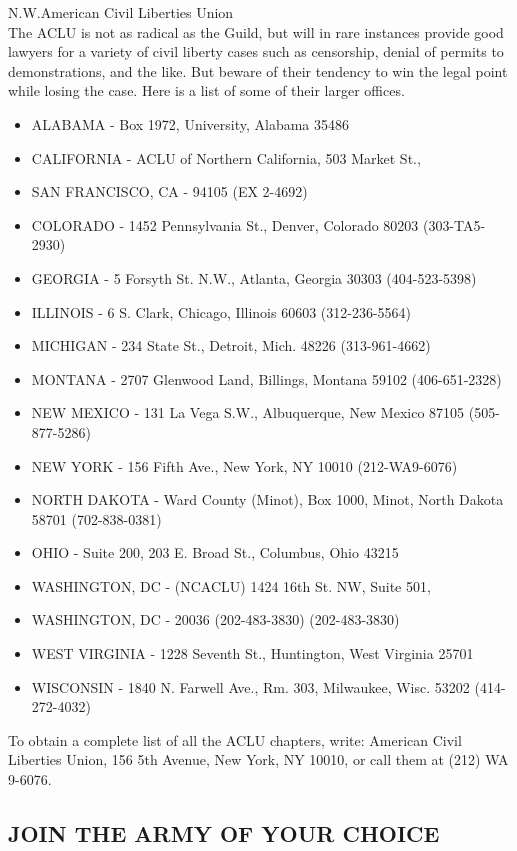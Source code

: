 \documentclass[11pt,twoside,a4paper]{book}
\begin{document}
N.W.American Civil Liberties Union~\\
The ACLU is not as radical as the Guild, but will in rare instances provide good lawyers for a variety of civil liberty cases such as censorship, denial of permits to demonstrations, and the like. But beware of their tendency to win the legal point while losing the case. Here is a list of some of their larger offices.~\\
\begin{itemize}
	\item ALABAMA - Box 1972, University, Alabama 35486 
	\item CALIFORNIA - ACLU of Northern California, 503 Market St., 
	\item SAN FRANCISCO, CA - 94105 (EX 2-4692) 
	\item COLORADO - 1452 Pennsylvania St.,  Denver, Colorado 80203 (303-TA5-2930) 
	\item GEORGIA - 5 Forsyth St. N.W., Atlanta, Georgia 30303 (404-523-5398) 
	\item ILLINOIS - 6 S. Clark, Chicago, Illinois 60603 (312-236-5564) 
	\item MICHIGAN - 234 State St., Detroit, Mich. 48226 (313-961-4662) 
	\item MONTANA - 2707 Glenwood Land, Billings, Montana 59102 (406-651-2328) \item NEW MEXICO - 131 La Vega S.W., Albuquerque, New Mexico 87105 (505-877-5286) 
	\item NEW YORK - 156 Fifth Ave., New York, NY 10010 (212-WA9-6076) 
	\item NORTH DAKOTA - Ward County (Minot), Box 1000, Minot, North Dakota 58701 (702-838-0381) 
	\item OHIO - Suite 200, 203 E. Broad St., Columbus, Ohio 43215 
	\item WASHINGTON, DC - (NCACLU) 1424 16th St. NW, Suite 501,  
	\item WASHINGTON, DC -  20036 (202-483-3830) (202-483-3830) 
	\item WEST VIRGINIA - 1228 Seventh St., Huntington, West Virginia 25701 
	\item WISCONSIN  - 1840 N. Farwell Ave., Rm. 303, Milwaukee, Wisc. 53202 (414-272-4032)
\end{itemize}
To obtain a complete list of all the ACLU chapters, write: American Civil Liberties Union, 156 5th Avenue, New York, NY 10010, or call them at (212) WA 9-6076.~\\

\subsection{JOIN THE ARMY OF YOUR CHOICE}
\end{document}
